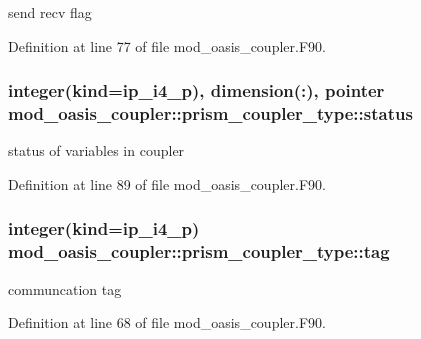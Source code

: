 send recv flag 



Definition at line 77 of file mod\+\_\+oasis\+\_\+coupler.\+F90.

\hypertarget{structmod__oasis__coupler_1_1prism__coupler__type_aee26373fa4a84f3c4e1841ba702f161c}{
\subsubsection[{status}]{\setlength{\rightskip}{0pt plus 5cm}integer(kind=ip\+\_\+i4\+\_\+p), dimension(\+:), pointer mod\+\_\+oasis\+\_\+coupler\+::prism\+\_\+coupler\+\_\+type\+::status\hspace{0.3cm}{\ttfamily [private]}}}\label{structmod__oasis__coupler_1_1prism__coupler__type_aee26373fa4a84f3c4e1841ba702f161c}


status of variables in coupler 



Definition at line 89 of file mod\+\_\+oasis\+\_\+coupler.\+F90.

\hypertarget{structmod__oasis__coupler_1_1prism__coupler__type_a3b8e0d2cd3f3001b4c82e7a911008a37}{
\subsubsection[{tag}]{\setlength{\rightskip}{0pt plus 5cm}integer(kind=ip\+\_\+i4\+\_\+p) mod\+\_\+oasis\+\_\+coupler\+::prism\+\_\+coupler\+\_\+type\+::tag\hspace{0.3cm}{\ttfamily [private]}}}\label{structmod__oasis__coupler_1_1prism__coupler__type_a3b8e0d2cd3f3001b4c82e7a911008a37}


communcation tag 



Definition at line 68 of file mod\+\_\+oasis\+\_\+coupler.\+F90.


